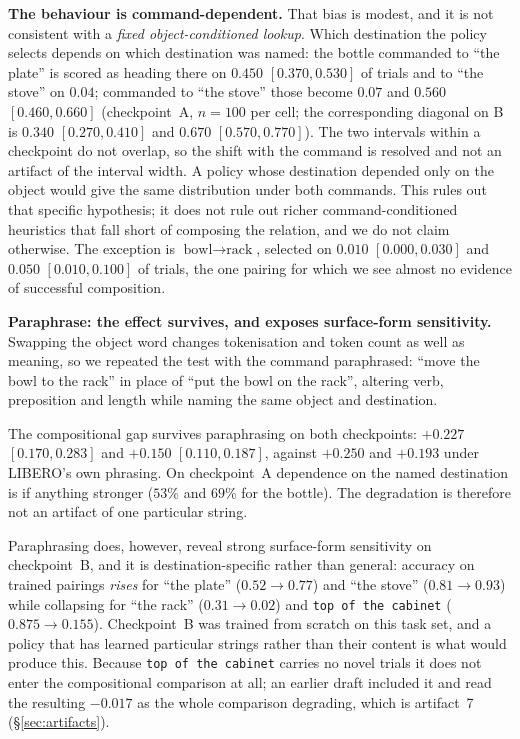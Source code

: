 \documentclass{article}
\begin{document}
\textbf{The behaviour is command-dependent.} That bias is modest, and it is not consistent
with a \emph{fixed object-conditioned lookup}. Which destination the policy selects depends on
which destination was named: the bottle commanded to ``the plate'' is scored as heading there
on $0.450$ $[0.370, 0.530]$ of trials and to ``the stove'' on $0.04$; commanded to ``the
stove'' those become $0.07$ and $0.560$ $[0.460, 0.660]$ (checkpoint~A, $n{=}100$ per cell; the
corresponding diagonal on B is $0.340$ $[0.270, 0.410]$ and $0.670$ $[0.570, 0.770]$). The two
intervals within a checkpoint do not overlap, so the shift with the command is resolved and not
an artifact of the interval width. A policy whose destination depended only on the object would
give the same distribution under both commands. This rules out that specific hypothesis; it
does not rule out richer command-conditioned heuristics that fall short of composing the
relation, and we do not claim otherwise. The exception is
$\textrm{bowl} \to \textrm{rack}$, selected on $0.010$ $[0.000, 0.030]$ and $0.050$
$[0.010, 0.100]$ of trials, the one pairing for which we see almost no evidence of successful
composition.

\textbf{Paraphrase: the effect survives, and exposes surface-form sensitivity.} Swapping the
object word changes tokenisation and token count as well as meaning, so we repeated the test
with the command paraphrased: ``move the bowl to the rack'' in place of ``put the bowl on the
rack'', altering verb, preposition and length while naming the same object and destination.

The compositional gap survives paraphrasing on both checkpoints: $+0.227$ $[0.170, 0.283]$ and
$+0.150$ $[0.110, 0.187]$, against $+0.250$ and $+0.193$ under LIBERO's own phrasing. On
checkpoint~A dependence on the named destination is if anything stronger ($53\%$ and $69\%$ for
the bottle). The degradation is therefore not an artifact of one particular string.

Paraphrasing does, however, reveal strong surface-form sensitivity on checkpoint~B, and it is
destination-specific rather than general: accuracy on trained pairings \emph{rises} for ``the
plate'' ($0.52 \to 0.77$) and ``the stove'' ($0.81 \to 0.93$) while collapsing for ``the rack''
($0.31 \to 0.02$) and \texttt{top of the cabinet} ($0.875 \to 0.155$). Checkpoint~B was trained
from scratch on this task set, and a policy that has learned particular strings rather than
their content is what would produce this. Because \texttt{top of the cabinet} carries no novel
trials it does not enter the compositional comparison at all; an earlier draft included it and
read the resulting $-0.017$ as the whole comparison degrading, which is artifact~7
(\S\ref{sec:artifacts}).
\end{document}
